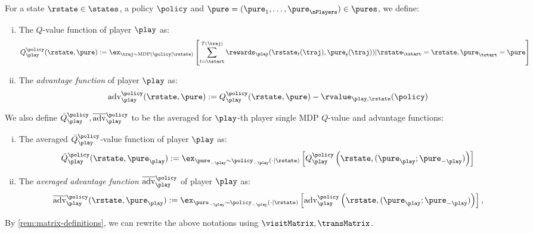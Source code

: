 \begin{definition}\label{def:Q&A}
For a state $\rstate \in \states$, a policy $\policy$ and $\pure = (\pure_{1},\dots,\pure_{\nPlayers}) \in \pures$, we define:
\begin{enumerate}[(i)]
	\item The $Q$-value function of player $\play$ as:
	\begin{equation}
		Q_{\play}^{\policy}(\rstate,\pure):= \ex_{\traj \sim \MDP(\policy|\rstate)}\left[ \sum_{\time = \tstart}^{T(\traj)} \rewards_{\play}(\rstate_{\time}(\traj), \pure_{\time}(\traj)) \vert \rstate_{\tstart} = \rstate, \pure_{\tstart} = \pure \right]
	\end{equation}
	\item The \emph{advantage function} of player $\play$ as:
	\begin{equation}
		\adv_{\play}^{\policy}(\rstate,\pure):= Q_{\play}^{\policy}(\rstate,\pure) - \rvalue_{\play,\rstate}(\policy)
	\end{equation}
\end{enumerate}
We also define $\bar{Q}_{\play}^{\policy}, \avgadv_{\play}^{\policy}$ to be the averaged for $\play$-th player single MDP $Q$-value and advantage functions:
\begin{enumerate}[(i)]
	\item The averaged $\bar{Q}_{\play}^{\policy}$-value function of player $\play$ as:
	\begin{equation}
		\bar{Q}_{\play}^{\policy}(\rstate,\pure_{\play}) := 
		 \ex_{\pure_{-\play} \sim \policy_{-\play}(\cdot \vert \rstate)}\left[ Q_{\play}^{\policy}\left(\rstate,(\pure_{\play};\pure_{-\play})\right) \right]
	\end{equation}
	\item The \emph{averaged advantage function} $\avgadv_{\play}^{\policy}$ of player $\play$ as:
	\begin{equation}
		\avgadv_{\play}^{\policy}(\rstate,\pure_{\play}) := \ex_{\pure_{-\play} \sim \policy_{-\play}(\cdot \vert \rstate)}\left[ \adv_{\play}^{\policy}\left(\rstate,(\pure_{\play};\pure_{-\play})\right) \right],
	\end{equation}
\end{enumerate}
\end{definition}
By \cref{rem:matrix-definitions}, we can rewrite the above notations using $\visitMatrix,\transMatrix$.

